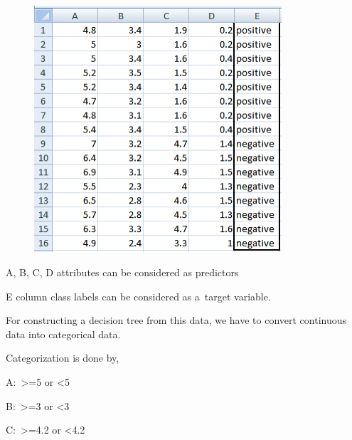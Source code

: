 \documentclass[12pt]{article}
\renewcommand{\_}{\kern-1.5pt\textunderscore\kern-1.5pt}
\begin{document}
\begin{figure}[H]
	\begin{Center}
		\includegraphics[width=3.62in,height=3.62in]{./media/image1.png}
	\end{Center}
\end{figure}



\par

{\fontsize{11pt}{13.2pt}\selectfont A, B, C, D attributes can be considered as predictors \par}\par

{\fontsize{11pt}{13.2pt}\selectfont E column class labels can be considered as a target variable. \par}\par

{\fontsize{11pt}{13.2pt}\selectfont For constructing a decision tree from this data, we have to convert continuous data into categorical data.\par}\par

{\fontsize{11pt}{13.2pt}\selectfont Categorization is done by,\par}\par

A:\  >=5 or <5\par

B:\  >=3 or <3\par

C:\  >=4.2 or <4.2\par
\end{document}
